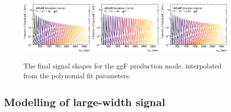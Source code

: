 \begin{figure}[htbp]
    \centering
    \includegraphics[width=0.32\textwidth]{figures/HMHZZ/signal/ggf_multipeakplot_4mu.eps}
    \includegraphics[width=0.32\textwidth]{figures/HMHZZ/signal/ggf_multipeakplot_4e.eps}
    \includegraphics[width=0.32\textwidth]{figures/HMHZZ/signal/ggf_multipeakplot_2mu2e.eps}
    \caption{The final signal shapes for the ggF production mode, interpolated from the polynomial fit parameters.}
    \label{fig:ggf_multipeak}
\end{figure}

\subsection{Modelling of large-width signal}


